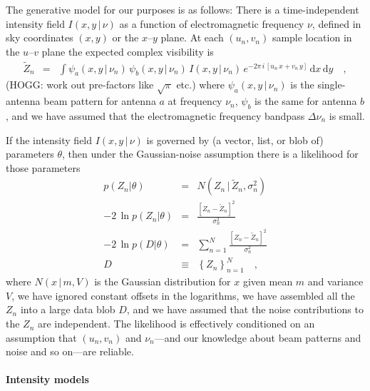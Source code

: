 \documentclass[12pt]{article}
\renewcommand{\exp}[1]{e^{#1}}
\newcommand{\set}[1]{\left\{{#1}\right\}}
\newcommand{\given}{\,|\,}
\newcommand{\expectation}[1]{\tilde{#1}}
\newcommand{\dd}{\mathrm{d}}
\newcommand{\normal}{N}
\begin{document}
The generative model for our purposes is as follows: There is a
time-independent intensity field $I(x,y\given\nu)$ as a function of
electromagnetic frequency $\nu$, defined in sky coordinates $(x,y)$ or
the $x$--$y$ plane.  At each $(u_n, v_n)$ sample location in the
$u$--$v$ plane the expected complex visibility is
\begin{eqnarray}
\expectation{Z}_n &=& \int \psi_a(x,y\given\nu_n)\,\psi_b(x,y\given\nu_n)\,I(x,y\given\nu_n)
                         \,\exp{-2\pi\,i\,[u_n\,x + v_n\,y]}\,\dd x\,\dd y
\quad ,
\end{eqnarray}
(HOGG: work out pre-factors like $\sqrt{\pi}$ etc.) where
$\psi_a(x,y\given\nu_n)$ is the single-antenna beam pattern for
antenna $a$ at frequency $\nu_n$, $\psi_b$ is the same for antenna
$b$, and we have assumed that the electromagnetic frequency bandpass
$\Delta\nu_n$ is small.

If the intensity field $I(x,y\given\nu)$ is governed by (a vector,
list, or blob of) parameters $\theta$, then under the Gaussian-noise
assumption there is a likelihood for those parameters
\begin{eqnarray}
p(Z_n|\theta) &=& \normal(Z_n\given\expectation{Z}_n,\sigma_n^2)
\\
-2\,\ln p(Z_n|\theta) &=& \frac{[Z_n - \expectation{Z}_n]^2}{\sigma_n^2}
\\
-2\,\ln p(D|\theta) &=& \sum_{n=1}^N \frac{[Z_n - \expectation{Z}_n]^2}{\sigma_n^2}
\\
D &\equiv& \set{Z_n}_{n=1}^N
\quad ,
\end{eqnarray}
where $\normal(x\given m,V)$ is the Gaussian distribution for $x$
given mean $m$ and variance $V$, we have ignored constant offsets in
the logarithms, we have assembled all the $Z_n$ into a large data blob
$D$, and we have assumed that the noise contributions to the $Z_n$ are
independent.  The likelihood is effectively conditioned on an
assumption that $(u_n, v_n)$ and $\nu_n$---and our knowledge about
beam patterns and noise and so on---are reliable.

\paragraph{Intensity models}
\end{document}
